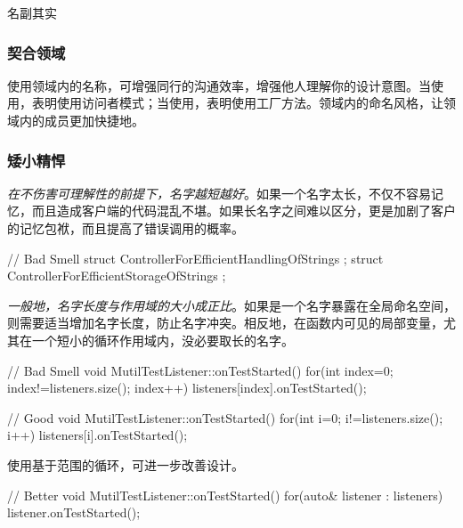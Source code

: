 \begin{content}
\begin{episode}{名副其实}
\begin{content}
\subsubsection{契合领域}

使用领域内的名称，可增强同行的沟通效率，增强他人理解你的设计意图。当使用，表明使用访问者模式；当使用，表明使用工厂方法。领域内的命名风格，让领域内的成员更加快捷地。

\begin{enum}
\end{enum}

\subsubsection{矮小精悍}

\emph{在不伤害可理解性的前提下，名字越短越好}。如果一个名字太长，不仅不容易记忆，而且造成客户端的代码混乱不堪。如果长名字之间难以区分，更是加剧了客户的记忆包袱，而且提高了错误调用的概率。

\begin{c++}[title={\ttfamily{坏味道：冗长，难以区分}}]
// Bad Smell
struct ControllerForEfficientHandlingOfStrings {};
struct ControllerForEfficientStorageOfStrings {};
\end{c++}

\emph{一般地，名字长度与作用域的大小成正比}。如果是一个名字暴露在全局命名空间，则需要适当增加名字长度，防止名字冲突。相反地，在函数内可见的局部变量，尤其在一个短小的循环作用域内，没必要取长的名字。

 \begin{c++}[title={\ttfamily{坏味道：使用index命名循环变量}}]
// Bad Smell
void MutilTestListener::onTestStarted() {
  for(int index=0; index!=listeners.size(); index++) {
    listeners[index].onTestStarted();
  }
}
 \end{c++} 

 \begin{c++}[title={\ttfamily{重构：使用i命名循环变量}}]
// Good
void MutilTestListener::onTestStarted() {
  for(int i=0; i!=listeners.size(); i++) {
    listeners[i].onTestStarted();
  }
}
 \end{c++} 

使用基于范围的循环，可进一步改善设计。

\begin{c++}[title={\ttfamily{重构：基于范围的\ascii{for}循环}}]
// Better
void MutilTestListener::onTestStarted() {
  for(auto& listener : listeners) {
    listener.onTestStarted();
  }
}
\end{c++}


\end{content}
\end{episode}
\end{content}
